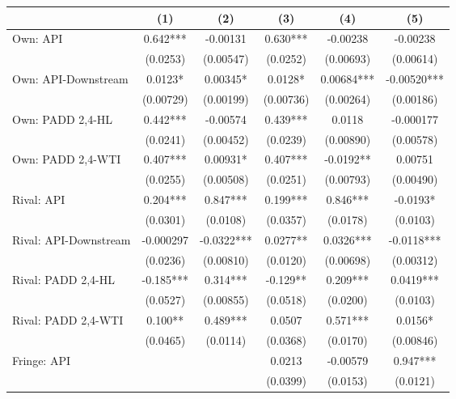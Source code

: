 {
\def\sym#1{\ifmmode^{#1}\else\(^{#1}\)\fi}
\begin{tabular}{l*{5}{c}}
\toprule
                &\multicolumn{1}{c}{(1)}   &\multicolumn{1}{c}{(2)}   &\multicolumn{1}{c}{(3)}   &\multicolumn{1}{c}{(4)}   &\multicolumn{1}{c}{(5)}   \\
\midrule
Own: API        &    0.642***& -0.00131   &    0.630***& -0.00238   & -0.00238   \\
                & (0.0253)   &(0.00547)   & (0.0252)   &(0.00693)   &(0.00614)   \\
\addlinespace
Own: API-Downstream&   0.0123*  &  0.00345*  &   0.0128*  &  0.00684***& -0.00520***\\
                &(0.00729)   &(0.00199)   &(0.00736)   &(0.00264)   &(0.00186)   \\
\addlinespace
Own: PADD 2,4-HL&    0.442***& -0.00574   &    0.439***&   0.0118   &-0.000177   \\
                & (0.0241)   &(0.00452)   & (0.0239)   &(0.00890)   &(0.00578)   \\
\addlinespace
Own: PADD 2,4-WTI&    0.407***&  0.00931*  &    0.407***&  -0.0192** &  0.00751   \\
                & (0.0255)   &(0.00508)   & (0.0251)   &(0.00793)   &(0.00490)   \\
\addlinespace
Rival: API      &    0.204***&    0.847***&    0.199***&    0.846***&  -0.0193*  \\
                & (0.0301)   & (0.0108)   & (0.0357)   & (0.0178)   & (0.0103)   \\
\addlinespace
Rival: API-Downstream&-0.000297   &  -0.0322***&   0.0277** &   0.0326***&  -0.0118***\\
                & (0.0236)   &(0.00810)   & (0.0120)   &(0.00698)   &(0.00312)   \\
\addlinespace
Rival: PADD 2,4-HL&   -0.185***&    0.314***&   -0.129** &    0.209***&   0.0419***\\
                & (0.0527)   &(0.00855)   & (0.0518)   & (0.0200)   & (0.0103)   \\
\addlinespace
Rival: PADD 2,4-WTI&    0.100** &    0.489***&   0.0507   &    0.571***&   0.0156*  \\
                & (0.0465)   & (0.0114)   & (0.0368)   & (0.0170)   &(0.00846)   \\
\addlinespace
Fringe: API     &            &            &   0.0213   & -0.00579   &    0.947***\\
                &            &            & (0.0399)   & (0.0153)   & (0.0121)   \\

\end{tabular}}
